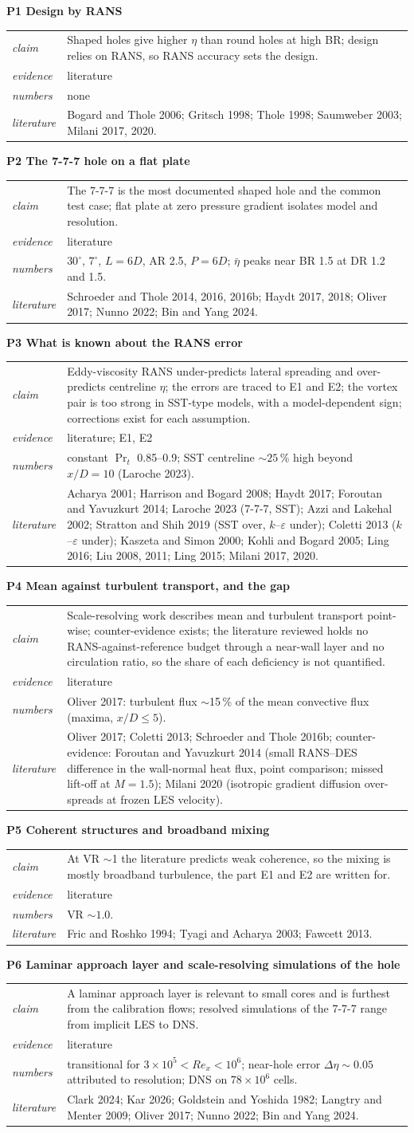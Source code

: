 \documentclass[10pt]{article}
\makeatletter
\newcommand{\etab}{\bar\eta}
\newcommand{\blk}[5]{\textbf{#1}\par
\begin{tabularx}{\textwidth}{@{}>{\itshape}l X@{}}
claim & #2\\ evidence & #3\\ numbers & #4\\ literature & #5\\
\end{tabularx}\par\smallskip}
\makeatother
\begin{document}
\blk{P1 Design by RANS}{Shaped holes give higher $\eta$ than round holes at high BR; design relies on RANS, so
RANS accuracy sets the design.}{literature}{none}{Bogard and Thole 2006; Gritsch 1998; Thole 1998; Saumweber 2003;
Milani 2017, 2020.}

\blk{P2 The 7-7-7 hole on a flat plate}{The 7-7-7 is the most documented shaped hole and the common test case;
flat plate at zero pressure gradient isolates model and resolution.}{literature}{$30^\circ$, $7^\circ$, $L=6D$,
AR 2.5, $P=6D$; $\etab$ peaks near BR 1.5 at DR 1.2 and 1.5.}{Schroeder and Thole 2014, 2016, 2016b; Haydt
2017, 2018; Oliver 2017; Nunno 2022; Bin and Yang 2024.}

\blk{P3 What is known about the RANS error}{Eddy-viscosity RANS under-predicts lateral spreading and
over-predicts centreline $\eta$; the errors are traced to E1 and E2; the vortex pair is too strong in SST-type
models, with a model-dependent sign; corrections exist for each assumption.}{literature; E1, E2}{constant $\Pr_t$
0.85--0.9; SST centreline $\sim25$\,\% high beyond $x/D=10$ (Laroche 2023).}{Acharya 2001; Harrison and Bogard 2008; Haydt 2017; Foroutan and Yavuzkurt 2014; Laroche 2023 (7-7-7,
SST); Azzi and Lakehal 2002; Stratton and Shih 2019 (SST over, $k$--$\varepsilon$ under); Coletti 2013 ($k$--$\varepsilon$
under); Kaszeta and Simon 2000; Kohli and Bogard 2005; Ling 2016; Liu 2008, 2011; Ling 2015; Milani 2017, 2020.}

\blk{P4 Mean against turbulent transport, and the gap}{Scale-resolving work describes mean and turbulent
transport point-wise; counter-evidence exists; the literature reviewed holds no RANS-against-reference budget
through a near-wall layer and no circulation ratio, so the share of each deficiency is not quantified.}{literature}{Oliver 2017:
turbulent flux $\sim$15\,\% of the mean convective flux (maxima, $x/D\le5$).}{Oliver 2017; Coletti 2013; Schroeder
and Thole 2016b; counter-evidence: Foroutan and Yavuzkurt 2014 (small RANS--DES difference in the wall-normal
heat flux, point comparison; missed lift-off at $M=1.5$); Milani 2020 (isotropic gradient diffusion over-spreads at
frozen LES velocity).}

\blk{P5 Coherent structures and broadband mixing}{At VR $\sim$1 the literature predicts weak coherence, so the
mixing is mostly broadband turbulence, the part E1 and E2 are written for.}{literature}{VR $\sim1.0$.}{Fric and
Roshko 1994; Tyagi and Acharya 2003; Fawcett 2013.}

\blk{P6 Laminar approach layer and scale-resolving simulations of the hole}{A laminar approach layer is relevant to small cores and is
furthest from the calibration flows; resolved simulations of the 7-7-7 range from implicit LES to DNS.}{literature}{transitional
for $3\times10^5<Re_x<10^6$; near-hole error $\Delta\eta\sim0.05$ attributed to resolution; DNS on
$78\times10^6$ cells.}{Clark 2024; Kar 2026; Goldstein and Yoshida 1982; Langtry and Menter 2009; Oliver 2017;
Nunno 2022; Bin and Yang 2024.}
\end{document}
